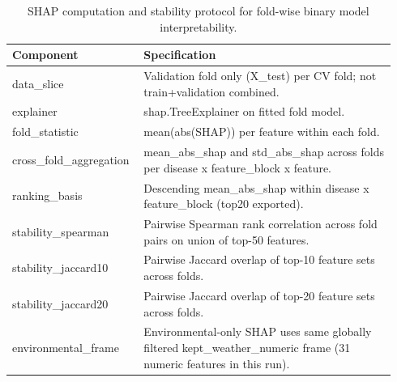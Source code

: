 \begin{table}[htbp]
\centering
\small
\begin{tabular}{p{0.30\linewidth} p{0.64\linewidth}}
\toprule
Component & Specification \\
\midrule
data\_slice & Validation fold only (X\_test) per CV fold; not train+validation combined. \\
explainer & shap.TreeExplainer on fitted fold model. \\
fold\_statistic & mean(abs(SHAP)) per feature within each fold. \\
cross\_fold\_aggregation & mean\_abs\_shap and std\_abs\_shap across folds per disease x feature\_block x feature. \\
ranking\_basis & Descending mean\_abs\_shap within disease x feature\_block (top20 exported). \\
stability\_spearman & Pairwise Spearman rank correlation across fold pairs on union of top-50 features. \\
stability\_jaccard10 & Pairwise Jaccard overlap of top-10 feature sets across folds. \\
stability\_jaccard20 & Pairwise Jaccard overlap of top-20 feature sets across folds. \\
environmental\_frame & Environmental-only SHAP uses same globally filtered kept\_weather\_numeric frame (31 numeric features in this run). \\
\bottomrule
\end{tabular}
\caption{SHAP computation and stability protocol for fold-wise binary model interpretability.}
\label{tab:shap_protocol}
\end{table}
